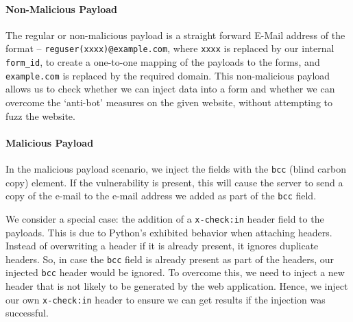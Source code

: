 \paragraph{Non-Malicious Payload}
\label{Comp:Fuzzer:nmp}
The regular or non-malicious payload is a straight forward E-Mail address of the format -- \texttt{reguser(xxxx)@example.com}, where \texttt{xxxx} is replaced by our internal \texttt{form\_id}, to create a one-to-one mapping of the payloads to the forms, and \texttt{example.com} is replaced by the required domain.
This non-malicious payload allows us to check whether we can inject data into a form and whether we can overcome the `anti-bot' measures on the given website, without attempting to fuzz the website. 

\paragraph{Malicious Payload}
\label{Comp:Fuzzer:mp}
In the malicious payload scenario, we inject the fields with the \texttt{bcc} (blind carbon copy) element. If the vulnerability is present, this will cause the server to send a copy of the e-mail to the e-mail address we added as part of the \texttt{bcc} field.

We consider a special case: the addition of a \texttt{x-check:in} header field to the payloads. This is due to Python's exhibited behavior when attaching
headers. Instead of overwriting a header if it is already present, it ignores duplicate headers. So, in case the \texttt{bcc} field is already present as part of the headers, our injected \texttt{bcc} header would be ignored. To overcome this, we need to inject a new header that is not likely to be generated by the web application. Hence, we inject our own \texttt{x-check:in} header to ensure we can get results if the injection was successful.

